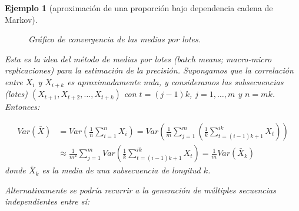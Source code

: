 \documentclass[
  10pt,
]{book}
\theoremstyle{break}
\newtheorem{example}{Ejemplo}[chapter]
\theoremstyle{nonumberplain}
\begin{document}
\begin{example}[aproximación de una proporción bajo dependencia cadena de Markov]
\begin{figure}[!htbp]
{}

\caption{Gráfico de convergencia de las medias por lotes.}\label{fig:conv-dep-lotes}
\end{figure}

Esta es la idea del método de medias por lotes (\emph{batch means}; \emph{macro-micro replicaciones}) para la estimación de la precisión.
Supongamos que la correlación entre \(X_i\) y \(X_{i+k}\) es aproximadamente nula, y consideramos las subsecuencias (lotes) \((X_{t+1},X_{t+2},\ldots,X_{t+k})\) con \(t=(j-1)k\), \(j=1,\ldots,m\) y \(n = mk\).
Entonces:

\[\begin{aligned}
Var \left(\bar X \right) &= Var \left(\frac{1}{n} \sum_{i=1}^n X_i\right) 
= Var \left( \frac{1}{m}\sum_{j=1}^m \left(\frac{1}{k} \sum_{t=(i-1)k + 1}^{ik} X_t\right) \right) \\
&\approx \frac{1}{m^2} \sum_{j=1}^m Var \left(\frac{1}{k} \sum_{t=(i-1)k + 1}^{ik} X_t\right)
= \frac{1}{m} Var \left(\bar{X}_k \right)
\end{aligned}\]
donde \(\bar{X}_k\) es la media de una subsecuencia de longitud \(k\).

Alternativamente se podría recurrir a la generación de múltiples secuencias independientes entre sí:


\end{example}
\end{document}
